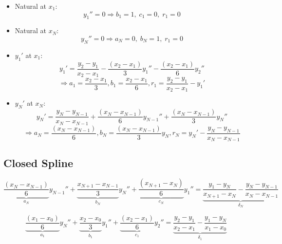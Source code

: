 \documentclass[aps,onecolumn,11pt]{revtex4}
\begin{document}
\begin{itemize}
\item Natural at $x_1$:
\begin{equation}
	y_1'' = 0 \Rightarrow  b_1=1,\;c_1=0,\;r_1=0
\end{equation}
\item Natural at $x_N$:
\begin{equation}
	y_N'' = 0 \Rightarrow a_N=0,\;b_N=1,\;r_1=0
\end{equation}

\item $y_1'$ at $x_1$:
\begin{equation}
	y_1' = \dfrac{y_2-y_1}{x_2-x_1} - \dfrac{(x_{2} - x_1)}{3} y_1'' - \dfrac{(x_{2} - x_1)}{6} y_{2}''
\end{equation}
$$
	\Rightarrow a_1=\dfrac{x_2-x_1}{3}, b_1=\dfrac{x_2-x_1}{6}, r_1 = \dfrac{y_2-y_1}{x_2-x_1} - y_1'
$$

\item $y_N'$ at $x_N$:
\begin{equation}
	y_N' = \dfrac{y_{N}-y_{N-1}}{x_{N}-x_{N-1}} + \dfrac{(x_{N} - x_{N-1})}{6} y_{N-1}'' + \dfrac{(x_{N} - x_{N-1})}{3} y_{N}''
\end{equation}
$$
	\Rightarrow a_N= \dfrac{(x_{N} - x_{N-1})}{6} , b_N = \dfrac{(x_{N} - x_{N-1})}{3} y_{N}, r_N = y_N' - \dfrac{y_{N}-y_{N-1}}{x_{N}-x_{N-1}}
$$
\end{itemize}

\subsection{Closed Spline}

\begin{equation}
  \underbrace{\dfrac{(x_{N} - x_{N-1})}{6}}_{a_N} y_{N-1}''
+ \underbrace{\dfrac{x_{N+1}-x_{N-1}}{3}}_{b_N} y_N''
+ \underbrace{\dfrac{(x_{N+1} - x_N)}{6}}_{c_N} y_{1}'' = 
\underbrace{\dfrac{y_{1}-y_{N}}{x_{N+1}-x_{N}} - \dfrac{y_{N}-y_{N-1}}{x_{N}-x_{N-1}}}_{\delta_N}
\end{equation}

\begin{equation}
  \underbrace{\dfrac{(x_{1} - x_{0})}{6}}_{a_1} y_{N}''
+ \underbrace{\dfrac{x_{2}-x_{0}}{3}}_{b_1} y_1''
+ \underbrace{\dfrac{(x_{2} - x_1)}{6}}_{c_1} y_{2}'' = 
\underbrace{\dfrac{y_{2}-y_{1}}{x_{2}-x_{1}} - \dfrac{y_{1}-y_{N}}{x_{1}-x_{0}}}_{\delta_1}
\end{equation}	
\end{document}
